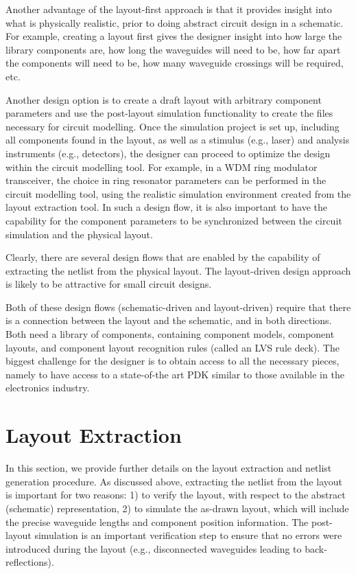 \documentclass[journal]{spie}
\begin{document}
Another advantage of the layout-first approach is that it provides insight into what is physically realistic, prior to doing abstract circuit design in a schematic.  For example, creating a layout first gives the designer insight into how large the library components are, how long the waveguides will need to be, how far apart the components will need to be, how many waveguide crossings will be required, etc.  

Another design option is to create a draft layout with arbitrary component parameters and use the post-layout simulation functionality to create the files necessary for circuit modelling.  Once the simulation project is set up, including all components found in the layout, as well as a stimulus (e.g., laser) and analysis instruments (e.g., detectors), the designer can proceed to optimize the design within the circuit modelling tool.  For example, in a WDM ring modulator transceiver, the choice in ring resonator parameters can be performed in the circuit modelling tool, using the realistic simulation environment created from the layout extraction tool.  In such a design flow, it is also important to have the capability for the component parameters to be synchronized between the circuit simulation and the physical layout.

Clearly, there are several design flows that are enabled by the capability of extracting the netlist from the physical layout.  The layout-driven design approach is likely to be attractive for small circuit designs.

Both of these design flows (schematic-driven and layout-driven) require that there is a connection between the layout and the schematic, and in both directions.  Both need a library of components, containing component models, component layouts, and component layout recognition rules (called an LVS rule deck).  The biggest challenge for the designer is to obtain access to all the necessary pieces, namely to have access to a state-of-the art PDK similar to those available in the electronics industry.  





\section{Layout Extraction}

In this section, we provide further details on the layout extraction and netlist generation procedure.  
As discussed above, extracting the netlist from the layout is important for two reasons: 1) to verify the layout, with respect to the abstract (schematic) representation, 2) to simulate the as-drawn layout, which will include the precise waveguide lengths and component position information.  The post-layout simulation is an important verification step to ensure that no errors were introduced during the layout (e.g., disconnected waveguides leading to back-reflections).
\end{document}
